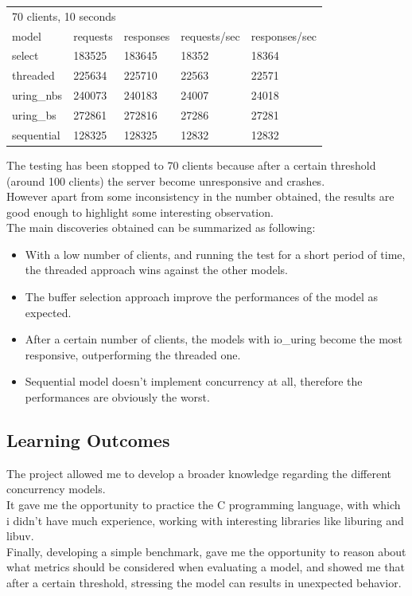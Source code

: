 \begin{table}[H]
\centering
\begin{tabular}{lllll}
\multicolumn{5}{l}{70 clients, 10 seconds}                       \\
model      & requests & responses & requests/sec & responses/sec \\
select     & 183525   & 183645    & 18352        & 18364         \\
threaded   & 225634   & 225710    & 22563        & 22571         \\
uring\_nbs & 240073   & 240183    & 24007        & 24018         \\
uring\_bs  & 272861   & 272816    & 27286        & 27281         \\
sequential & 128325   & 128325    & 12832        & 12832        
\end{tabular}
\end{table}

The testing has been stopped to 70 clients because after a certain threshold (around 100 clients) the server become unresponsive and crashes. \\
However apart from some inconsistency in the number obtained, the results are good enough to highlight some interesting observation. \\
The main discoveries obtained can be summarized as following:

\begin{itemize}
    \item With a low number of clients, and running the test for a short period of time, the threaded approach wins against the other models. 
    \item The buffer selection approach improve the performances of the model as expected.
    \item After a certain number of clients, the models with io\_uring become the most responsive, outperforming the threaded one.
    \item Sequential model doesn't implement concurrency at all, therefore the performances are obviously the worst.
\end{itemize}

\subsection{Learning Outcomes}

The project allowed me to develop a broader knowledge regarding the different concurrency models. \\
It gave me the opportunity to practice the C programming language, with which i didn't have much experience, working with interesting libraries like liburing and libuv. \\
Finally, developing a simple benchmark, gave me the opportunity to reason about what metrics should be considered when evaluating a model, and showed me that after a certain threshold, stressing the model can results in unexpected behavior.

